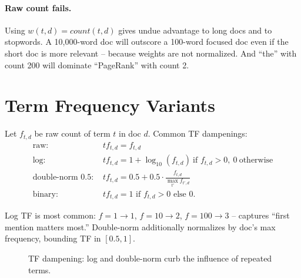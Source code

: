 \paragraph{Raw count fails.} Using $w(t,d)=count(t,d)$ gives undue advantage to long docs and to stopwords. A 10,000-word doc will outscore a 100-word focused doc even if the short doc is more relevant -- because weights are not normalized. And ``the'' with count 200 will dominate ``PageRank'' with count 2.

\section{Term Frequency Variants}\label{sec:tf}
\begin{definition}[TF Variants]
Let $f_{t,d}$ be raw count of term $t$ in doc $d$. Common TF dampenings:
\begin{align}
\text{raw: } & tf_{t,d}=f_{t,d} \\
\text{log: } & tf_{t,d}=1+\log_{10}(f_{t,d})\ \text{if }f_{t,d}>0,\ 0\ \text{otherwise}\\
\text{double-norm 0.5: } & tf_{t,d}=0.5+0.5\cdot\frac{f_{t,d}}{\max_{t'} f_{t',d}}\\
\text{binary: } & tf_{t,d}=1\text{ if }f_{t,d}>0\text{ else }0.
\end{align}
\end{definition}
Log TF is most common: $f=1\to1$, $f=10\to2$, $f=100\to3$ -- captures ``first mention matters most.'' Double-norm additionally normalizes by doc's max frequency, bounding TF in $[0.5,1]$.

\begin{figure}[h]\centering
{}
\caption{TF dampening: log and double-norm curb the influence of repeated terms.}
\label{fig:tf-curves}
\end{figure}

